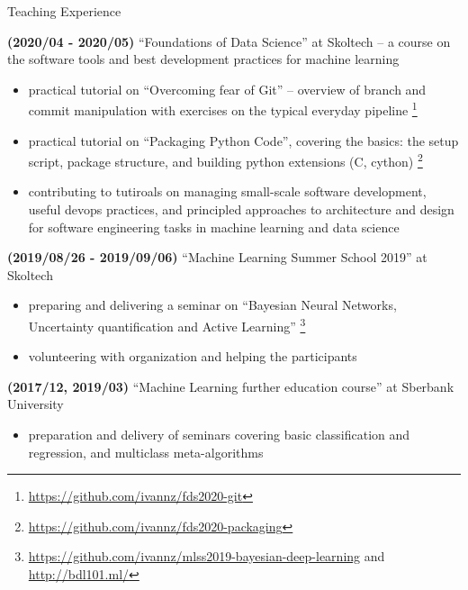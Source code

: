 \documentclass{resume} %
\begin{document}
\begin{rSection}{Teaching Experience}
    \item \textbf{(2020/04 - 2020/05)}
    ``Foundations of Data Science'' at Skoltech -- a course on the software tools and best development practices for machine learning 
    \begin{itemize}
        \item practical tutorial on ``Overcoming fear of Git'' -- overview of branch and commit manipulation with exercises on the typical everyday pipeline%
        \footnote{
            \url{https://github.com/ivannz/fds2020-git}
        }

        \item practical tutorial on ``Packaging Python Code'', covering the basics: the setup script, package structure, and building python extensions (C, cython)%
        \footnote{
            \url{https://github.com/ivannz/fds2020-packaging}
        }

        \item contributing to tutiroals on managing small-scale software development, useful devops practices, and principled approaches to architecture and design for software engineering tasks in machine learning and data science
    \end{itemize}

    \item \textbf{(2019/08/26 - 2019/09/06)}
    ``Machine Learning Summer School 2019'' at Skoltech
    \begin{itemize}
        \item preparing and delivering a seminar on ``Bayesian Neural Networks, Uncertainty quantification and Active Learning''%
        \footnote{
            \url{https://github.com/ivannz/mlss2019-bayesian-deep-learning}
            and \url{http://bdl101.ml/}
        }

        \item volunteering with organization and helping the participants
    \end{itemize}

    \item \textbf{(2017/12, 2019/03)}  %
    ``Machine Learning further education course'' at Sberbank University
    \begin{itemize}
        \item preparation and delivery of seminars covering basic classification and regression, and multiclass meta-algorithms
    \end{itemize}


\end{rSection}
\end{document}
